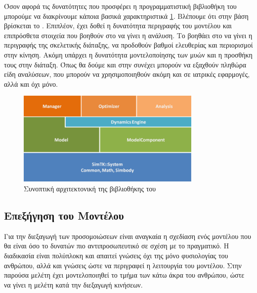 Όσον αφορά τις δυνατότητες που προσφέρει η προγραμματιστική βιβλιοθήκη του  μπορούμε να διακρίνουμε κάποια βασικά χαρακτηριστικά \ref{fig:opensim-architecture}. Βλέπουμε ότι στην βάση βρίσκεται το . Επιπλέον, έχει δοθεί η δυνατότητα περιγραφής του μοντέλου και επιπρόσθετα στοιχεία που βοηθούν στο να γίνει η ανάλυση. Το  βοηθάει στο να γίνει η περιγραφής της σκελετικής διάταξης, να προδοθούν βαθμοί ελευθερίας και περιορισμοί στην κίνηση. Ακόμη υπάρχει η δυνατότητα μοντελοποίησης των μυών και η προσθήκη τους στην διάταξη. Όπως θα δούμε και στην συνέχει μπορούν να εξαχθούν πληθώρα είδη αναλύσεων, που μπορούν να χρησιμοποιηθούν ακόμη και σε ιατρικές εφαρμογές, αλλά και όχι μόνο.

\begin{figure}[H]
    \centering
    \includegraphics[width=0.8\textwidth]{methods/fig/opensim-architecture.png}
    \caption{Συνοπτική αρχιτεκτονική της βιβλιοθήκης του \protect\footnotemark}
    \label{fig:opensim-architecture}
\end{figure}


\subsection{Επεξήγηση του Μοντέλου}

Για την διεξαγωγή των προσομοιώσεων είναι αναγκαία η σχεδίαση ενός μοντέλου που θα είναι όσο το δυνατών πιο αντιπροσωπευτικό σε σχέση με το πραγματικό. Η διαδικασία είναι πολύπλοκη και απαιτεί γνώσεις όχι της μόνο φυσιολογίας του ανθρώπου, αλλά και γνώσεις ώστε να περιγραφεί η λειτουργία του μοντέλου. Στην παρούσα μελέτη έχει μοντελοποιηθεί το τμήμα των κάτω άκρα του ανθρώπου, ώστε να γίνει η μελέτη κατά την διεξαγωγή κινήσεων.

